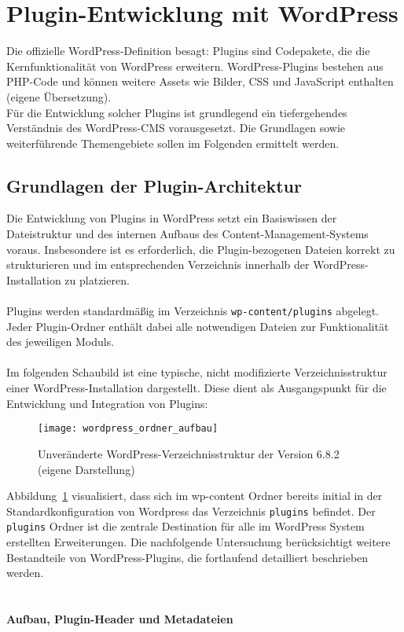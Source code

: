 \section{Plugin-Entwicklung mit WordPress}

Die offizielle WordPress-Definition besagt: \glqq Plugins sind Codepakete, die die Kernfunktionalität von WordPress erweitern.
WordPress-Plugins bestehen aus PHP-Code und können weitere Assets wie Bilder,
CSS und JavaScript enthalten\grqq{} \cite{wordpress2024plugin} (eigene Übersetzung).
\\
Für die Entwicklung solcher Plugins ist grundlegend ein tiefergehendes Verständnis des WordPress-CMS vorausgesetzt.
Die Grundlagen sowie weiterführende Themengebiete sollen im Folgenden ermittelt werden.



\subsection{Grundlagen der Plugin-Architektur}

Die Entwicklung von Plugins in WordPress setzt ein Basiswissen der Dateistruktur und des internen Aufbaus des Content-Management-Systems voraus.
Insbesondere ist es erforderlich, die Plugin-bezogenen Dateien korrekt zu strukturieren und im entsprechenden Verzeichnis innerhalb der WordPress-Installation zu platzieren.\\\\
Plugins werden standardmäßig im Verzeichnis \texttt{wp-content/plugins} abgelegt.
Jeder Plugin-Ordner enthält dabei alle notwendigen Dateien zur Funktionalität des jeweiligen Moduls.\\\\
Im folgenden Schaubild ist eine typische, nicht modifizierte Verzeichnisstruktur einer WordPress-Installation dargestellt.
Diese dient als Ausgangspunkt für die Entwicklung und Integration von Plugins:

\begin{figure}[tbh]
 \centering
 \texttt{[image: wordpress\_ordner\_aufbau]}
 \caption{Unveränderte WordPress-Verzeichnisstruktur der Version 6.8.2 (eigene Darstellung)}
 \label{fig:wordpress-verzeichnis}
\end{figure}
\newpage
Abbildung~\ref{fig:wordpress-verzeichnis} visualisiert, dass sich im wp-content Ordner bereits initial in der Standardkonfiguration von Wordpress das Verzeichnis \texttt{plugins} befindet.
Der \texttt{plugins} Ordner ist die zentrale Destination für alle im WordPress System erstellten Erweiterungen.
Die nachfolgende Untersuchung berücksichtigt weitere Bestandteile von WordPress-Plugins, die fortlaufend detailliert beschrieben werden.
\\\\\\
\textbf{Aufbau, Plugin-Header und Metadateien}

